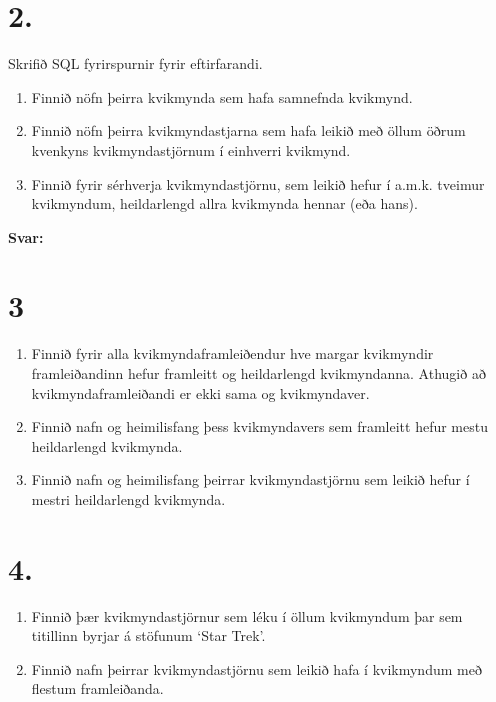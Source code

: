 \documentclass{article}
\newcommand{\sv}{\textbf{Svar:}}
\newcommand{\enum}{\begin{enumerate}[label = \alph*.]}
\begin{document}
\newpage

\section{2.}
Skrifið SQL fyrirspurnir fyrir eftirfarandi.

\enum
\item Finnið nöfn þeirra kvikmynda sem hafa samnefnda kvikmynd.
\item Finnið nöfn þeirra kvikmyndastjarna sem hafa leikið með
öllum öðrum kvenkyns kvikmyndastjörnum í einhverri kvikmynd.
\item Finnið fyrir sérhverja kvikmyndastjörnu, sem leikið hefur í
a.m.k. tveimur kvikmyndum, heildarlengd allra kvikmynda hennar
(eða hans).
\end{enumerate}

\sv



\vspace{1cm}

\section{3}
\enum
\item Finnið fyrir alla kvikmyndaframleiðendur hve margar
kvikmyndir framleiðandinn hefur framleitt og heildarlengd 
kvikmyndanna. Athugið að kvikmyndaframleiðandi er ekki sama og
kvikmyndaver. 
\item Finnið nafn og heimilisfang þess kvikmyndavers sem framleitt
hefur mestu heildarlengd kvikmynda.
\item Finnið nafn og heimilisfang þeirrar kvikmyndastjörnu sem
leikið hefur í mestri heildarlengd kvikmynda.
\end{enumerate}

\vspace{1cm}

\section{4.}

\enum 
\item Finnið þær kvikmyndastjörnur sem léku í öllum kvikmyndum
þar sem titillinn byrjar á stöfunum ‘Star Trek’.
\item Finnið nafn þeirrar kvikmyndastjörnu sem leikið hafa í
kvikmyndum með flestum framleiðanda.
\end{enumerate}

\vspace{1cm}
\end{document}

